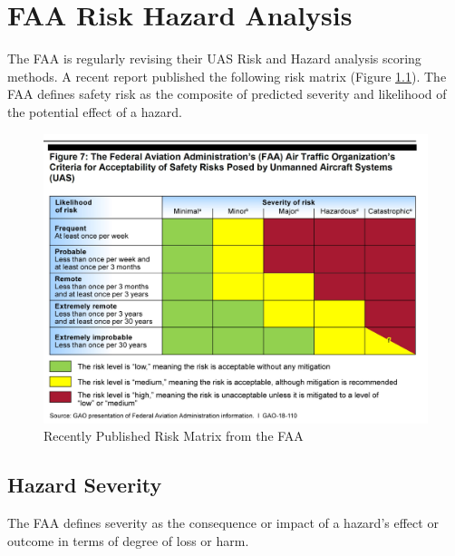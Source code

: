 \documentclass[
]{book}
\begin{document}
\hypertarget{ch-risk-analysis}{%
\chapter{FAA Risk Hazard Analysis}\label{ch-risk-analysis}}

The FAA is regularly revising their UAS Risk and Hazard analysis scoring methods. A recent report published the following risk matrix (Figure \ref{fig:risk-matrix}). The FAA defines safety risk as the composite of predicted severity and likelihood of the potential effect of a hazard.

\begin{figure}

{\centering \includegraphics[width=0.8\linewidth]{images/Risk_Matrix} 

}

\caption{Recently Published Risk Matrix from the FAA}\label{fig:risk-matrix}
\end{figure}

\hypertarget{hazard-severity}{%
\section{Hazard Severity}\label{hazard-severity}}

The FAA defines severity as the consequence or impact of a hazard's effect or outcome in terms of degree of loss or harm.
\end{document}
